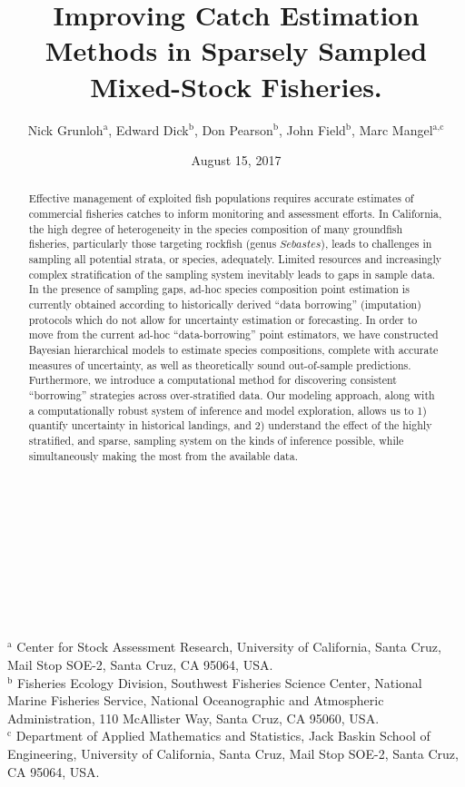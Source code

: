 \documentclass[12pt]{article}
\begin{document}
%
\title{Improving Catch Estimation Methods in Sparsely Sampled Mixed-Stock Fisheries.}
\author{Nick Grunloh$^\text{a}$, Edward Dick$^\text{b}$, Don Pearson$^\text{b}$, John Field$^\text{b}$, Marc Mangel$^\text{a,c}$}
\date{August 15, 2017}
%
\maketitle
%
\begin{abstract}
%
Effective management of exploited fish populations requires accurate
estimates of commercial fisheries catches to inform monitoring and
assessment efforts. In California, the high degree of heterogeneity in
the species composition of many groundfish fisheries, particularly those
targeting rockfish (genus $Sebastes$), leads to challenges in sampling all
potential strata, or species, adequately. Limited resources and
increasingly complex stratification of the sampling system inevitably
leads to gaps in sample data. In the presence of sampling gaps, ad-hoc
species composition point estimation is currently obtained according to
historically derived ``data borrowing'' (imputation) protocols which do
not allow for uncertainty estimation or forecasting. In order to move
from the current ad-hoc ``data-borrowing'' point estimators, we have
constructed Bayesian hierarchical models to estimate species
compositions, complete with accurate measures of uncertainty, as well as
theoretically sound out-of-sample predictions. Furthermore, we introduce
a computational method for discovering consistent ``borrowing''
strategies across over-stratified data. Our modeling approach, along
with a computationally robust system of inference and model exploration,
allows us to 1) quantify uncertainty in historical landings, and 2) understand
the effect of the highly stratified, and sparse, sampling system on the kinds
of inference possible, while simultaneously making the most from the available 
data.
\end{abstract}
%
$~$\\$~$\\$~$\\$~$\\$~$\\$~$\\$~$\\
$^\text{a}$ Center for Stock Assessment Research, University of California, Santa Cruz, Mail Stop SOE-2, Santa Cruz, CA 95064, USA.\\
$^\text{b}$ Fisheries Ecology Division, Southwest Fisheries Science Center, National Marine Fisheries Service, National Oceanographic and Atmospheric Administration, 110 McAllister Way, Santa Cruz, CA 95060, USA.\\
$^\text{c}$ Department of Applied Mathematics and Statistics, Jack Baskin School of Engineering, University of California, Santa Cruz, Mail Stop SOE-2, Santa Cruz, CA 95064, USA.
\clearpage
{}
\end{document}
